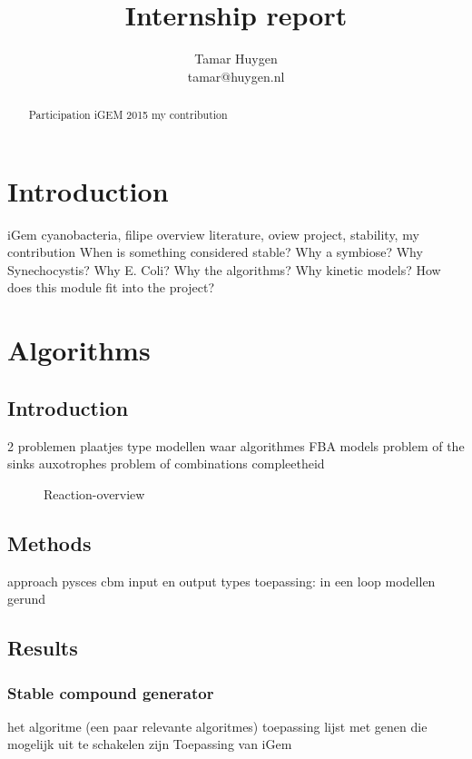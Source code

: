 \documentclass[10pt]{report}
\title{Internship report}
\author{Tamar Huygen \\ tamar@huygen.nl}
\begin{document}
\maketitle

\begin{abstract}
  Participation iGEM 2015 my contribution
\end{abstract}

\chapter{Introduction}
iGem cyanobacteria, filipe overview literature,
oview project, stability, my contribution
When is something considered stable?
Why a symbiose?
Why Synechocystis?
Why E. Coli?
Why the algorithms?
Why kinetic models?
How does this module fit into the project?

\chapter{Algorithms}

\begin{abstract}
  
\end{abstract}

\section{Introduction}
2 problemen
plaatjes
type modellen waar algorithmes
FBA models
problem of the sinks
auxotrophes
problem of combinations
compleetheid


\begin{figure}[hbtp]
  \centering
     
      \caption{Reaction-overview}
  \label{fig:reaction-overview}
\end{figure}


\section{Methods}
approach
pysces cbm
input en output types
toepassing: in een loop modellen gerund

\section{Results}
\subsection{Stable compound generator}
het algoritme (een paar relevante algoritmes)
toepassing lijst met genen die mogelijk uit te schakelen zijn
Toepassing van iGem
\end{document}
